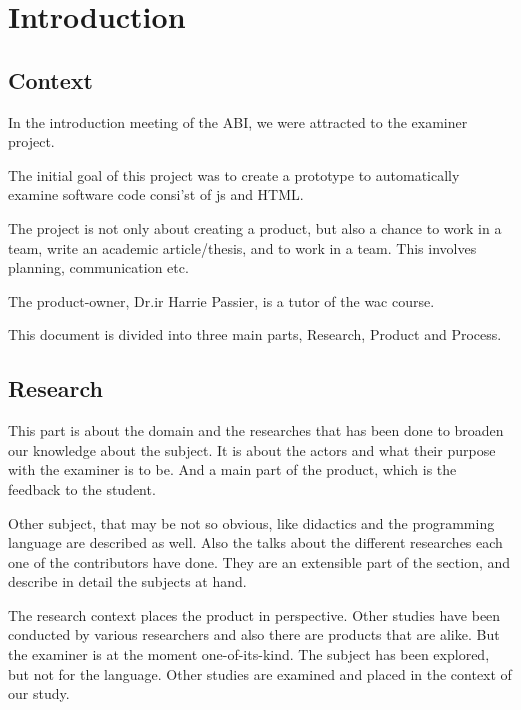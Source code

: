 \chapter{Introduction}



\section{Context} 

In the introduction meeting of the ABI, we were attracted to the \gls{examiner} project.

The initial goal of this project was to create a prototype to automatically examine
software code consi'st of \gls{js} and HTML.

The project is not only about creating a product, but also a chance to work in a team, write an academic article/thesis, and to work in a team. This involves planning, communication etc.

The product-owner, Dr.ir Harrie Passier, is a tutor of the \gls{wac} course.


This document is divided into three main parts, Research, Product and Process.

\section{Research}
This part is about the domain and the researches that has been done to broaden our knowledge about the subject.
It is about the actors and what their purpose with the \gls{examiner} is to be.
And a main part of the product, which is the feedback to the student.

Other subject, that may be not so obvious, like didactics and the programming language are described as well.
Also the talks about the different researches each one of the contributors have done.
They are an extensible part of the section, and describe in detail the subjects at hand.

The research context places the product in perspective. Other studies have been conducted by various researchers and also there are products that are alike.
But the \gls{examiner} is at the moment one-of-its-kind.
The subject has been explored, but not for the  language.
Other studies are examined and placed in the context of our study.

